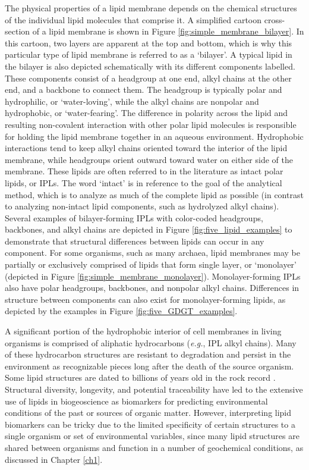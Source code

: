 The physical properties of a lipid membrane depends on the chemical structures of the individual lipid molecules that comprise it. A simplified cartoon cross-section of a lipid membrane is shown in Figure \ref{fig:simple_membrane_bilayer}. In this cartoon, two layers are apparent at the top and bottom, which is why this particular type of lipid membrane is referred to as a `bilayer'. A typical lipid in the bilayer is also depicted schematically with its different components labelled. These components consist of a headgroup at one end, alkyl chains at the other end, and a backbone to connect them. The headgroup is typically polar and hydrophilic, or `water-loving', while the alkyl chains are nonpolar and hydrophobic, or `water-fearing'. The difference in polarity across the lipid and resulting non-covalent interaction with other polar lipid molecules is responsible for holding the lipid membrane together in an aqueous environment. Hydrophobic interactions tend to keep alkyl chains oriented toward the interior of the lipid membrane, while headgroups orient outward toward water on either side of the membrane. These lipids are often referred to in the literature as intact polar lipids, or IPLs. The word `intact' is in reference to the goal of the analytical method, which is to analyze as much of the complete lipid as possible (in contrast to analyzing non-intact lipid components, such as hydrolyzed alkyl chains). Several examples of bilayer-forming IPLs with color-coded headgroups, backbones, and alkyl chains are depicted in Figure \ref{fig:five_lipid_examples} to demonstrate that structural differences between lipids can occur in any component. For some organisms, such as many archaea, lipid membranes may be partially or exclusively comprised of lipids that form single layer, or `monolayer' (depicted in Figure \ref{fig:simple_membrane_monolayer}). Monolayer-forming IPLs also have polar headgroups, backbones, and nonpolar alkyl chains. Differences in structure between components can also exist for monolayer-forming lipids, as depicted by the examples in Figure \ref{fig:five_GDGT_examples}.

A significant portion of the hydrophobic interior of cell membranes in living organisms is comprised of aliphatic hydrocarbons (\textit{e.g.}, IPL alkyl chains). Many of these hydrocarbon structures are resistant to degradation and persist in the environment as recognizable pieces long after the death of the source organism. Some lipid structures are dated to billions of years old in the rock record \citep{brocks2003composition, brocks2003reconstruction}. Structural diversity, longevity, and potential traceability have led to the extensive use of lipids in biogeoscience as biomarkers for predicting environmental conditions of the past or sources of organic matter. However, interpreting lipid biomarkers can be tricky due to the limited specificity of certain structures to a single organism or set of environmental variables, since many lipid structures are shared between organisms and function in a number of geochemical conditions, as discussed in Chapter \ref{ch1}.

